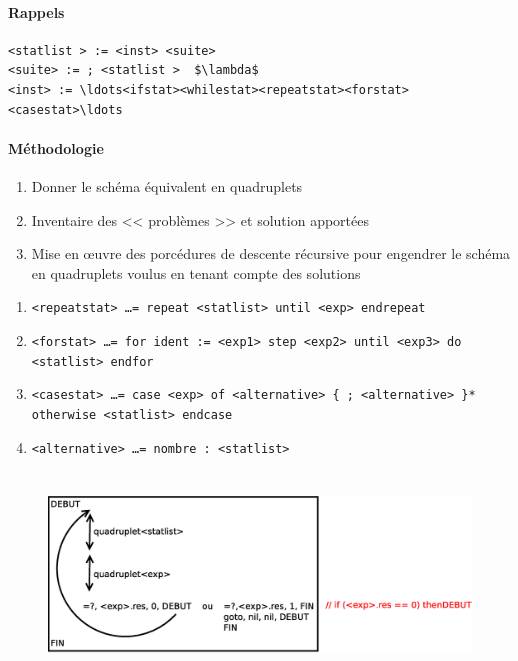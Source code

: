 \documentclass[12pt,a4paper,openany]{book}
\begin{document}
\begin{remarque}
	\paragraph{Rappels}
	\begin{lstlisting}
<statlist > := <inst> <suite>
<suite> := ; <statlist >  $\lambda$ 
<inst> := \ldots<ifstat><whilestat><repeatstat><forstat><casestat>\ldots
\end{lstlisting}
\paragraph{Méthodologie}
\begin{enumerate}
	\item Donner le schéma équivalent en quadruplets
	\item Inventaire des << problèmes >> et solution apportées
	\item Mise en œuvre des porcédures de descente récursive pour engendrer le schéma en quadruplets voulus en tenant compte des solutions
\end{enumerate}

\begin{enumerate}
	\item \texttt{<repeatstat> \dots=     repeat <statlist> until <exp> endrepeat}
	\item \texttt{<forstat> \dots=     for ident := <exp1> step <exp2> until <exp3>
		do <statlist> endfor }
	\item \texttt{<casestat> \dots=     case <exp> of <alternative> \{ ; <alternative> \}*
		otherwise <statlist> endcase
		}
	\item \texttt{<alternative> \dots= nombre : <statlist>}
\end{enumerate}
\end{remarque}
\section{}

\begin{figure}[H]
	\centering
\includegraphics[width=14cm]{repeatstat.eps}
\end{figure}
\end{document}
